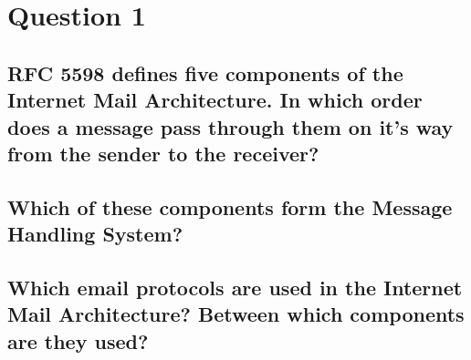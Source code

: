 \documentclass{report}
\begin{document}
	\section{Question 1}
	\startsection
		\renewcommand{\thesubsection}{\thesection.\Alph{subsection}}
		\subsection{RFC 5598 defines five components of the Internet Mail Architecture. In which order does a message pass through them on it's way from the sender to the receiver?}
		\startsubsection
		\closesection
		\subsection{Which of these components form the Message Handling System?}
		\startsubsection
		\closesection
		\subsection{Which email protocols are used in the Internet Mail Architecture? Between which components are they used?}
		\startsubsection
		\closesection
	\closesection
\end{document}
